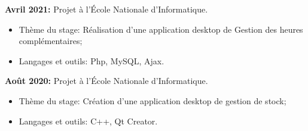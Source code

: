 \documentclass[12pt]{report}
\begin{document}
\begin{center}
\begin{minipage}{\textwidth}
\begin{itemize}
						\end{itemize} 
					\textbf{Avril 2021:} Projet à l’École Nationale d'Informatique.
						\begin{itemize}
							\item Thème du stage: Réalisation d’une application desktop de Gestion des heures complémentaires;
							\item Langages et outils: Php, MySQL, Ajax.								
						\end{itemize} 
					\textbf{Août 2020:} Projet à l’École Nationale d'Informatique.
						\begin{itemize}
							\item Thème du stage: Création d'une application desktop de gestion de stock;
							\item Langages et outils: C++, Qt Creator.								
						\end{itemize} 
   				\end{minipage}		
			\end{center}
\end{document}
